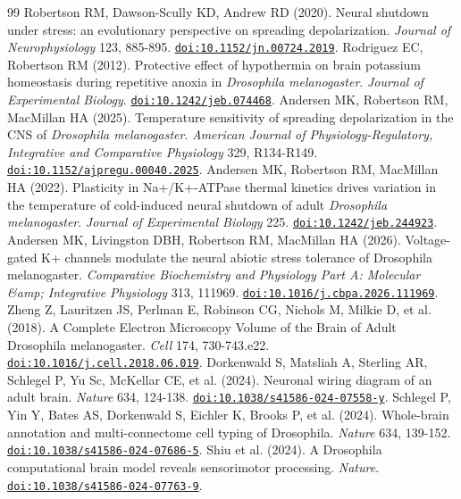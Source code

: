 \documentclass[11pt]{article}
\begin{document}
\begin{thebibliography}{99}
 Robertson RM, Dawson-Scully KD, Andrew RD (2020). Neural shutdown under stress: an evolutionary perspective on spreading depolarization. \emph{Journal of Neurophysiology} 123, 885-895. \href{https://doi.org/10.1152/jn.00724.2019}{\nolinkurl{doi:10.1152/jn.00724.2019}}.
 Rodriguez EC, Robertson RM (2012). Protective effect of hypothermia on brain potassium homeostasis during repetitive anoxia in \emph{Drosophila melanogaster}. \emph{Journal of Experimental Biology}. \href{https://doi.org/10.1242/jeb.074468}{\nolinkurl{doi:10.1242/jeb.074468}}.
 Andersen MK, Robertson RM, MacMillan HA (2025). Temperature sensitivity of spreading depolarization in the CNS of \emph{Drosophila melanogaster}. \emph{American Journal of Physiology-Regulatory, Integrative and Comparative Physiology} 329, R134-R149. \href{https://doi.org/10.1152/ajpregu.00040.2025}{\nolinkurl{doi:10.1152/ajpregu.00040.2025}}.
 Andersen MK, Robertson RM, MacMillan HA (2022). Plasticity in Na+/K+-ATPase thermal kinetics drives variation in the temperature of cold-induced neural shutdown of adult \emph{Drosophila melanogaster}. \emph{Journal of Experimental Biology} 225. \href{https://doi.org/10.1242/jeb.244923}{\nolinkurl{doi:10.1242/jeb.244923}}.
 Andersen MK, Livingston DBH, Robertson RM, MacMillan HA (2026). Voltage-gated K+ channels modulate the neural abiotic stress tolerance of Drosophila melanogaster. \emph{Comparative Biochemistry and Physiology Part A: Molecular \&amp; Integrative Physiology} 313, 111969. \href{https://doi.org/10.1016/j.cbpa.2026.111969}{\nolinkurl{doi:10.1016/j.cbpa.2026.111969}}.
 Zheng Z, Lauritzen JS, Perlman E, Robinson CG, Nichols M, Milkie D, et al. (2018). A Complete Electron Microscopy Volume of the Brain of Adult Drosophila melanogaster. \emph{Cell} 174, 730-743.e22. \href{https://doi.org/10.1016/j.cell.2018.06.019}{\nolinkurl{doi:10.1016/j.cell.2018.06.019}}.
 Dorkenwald S, Matsliah A, Sterling AR, Schlegel P, Yu Sc, McKellar CE, et al. (2024). Neuronal wiring diagram of an adult brain. \emph{Nature} 634, 124-138. \href{https://doi.org/10.1038/s41586-024-07558-y}{\nolinkurl{doi:10.1038/s41586-024-07558-y}}.
 Schlegel P, Yin Y, Bates AS, Dorkenwald S, Eichler K, Brooks P, et al. (2024). Whole-brain annotation and multi-connectome cell typing of Drosophila. \emph{Nature} 634, 139-152. \href{https://doi.org/10.1038/s41586-024-07686-5}{\nolinkurl{doi:10.1038/s41586-024-07686-5}}.
 Shiu et al. (2024). A Drosophila computational brain model reveals sensorimotor processing. \emph{Nature}. \href{https://doi.org/10.1038/s41586-024-07763-9}{\nolinkurl{doi:10.1038/s41586-024-07763-9}}.

\end{thebibliography}
\end{document}
